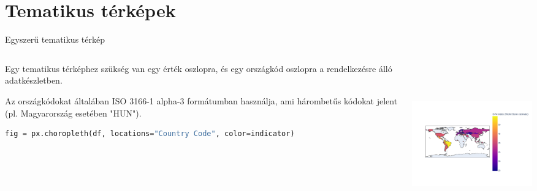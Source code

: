 \documentclass[english, aspectratio=169]{beamer}
\makeatletter
\let\origtableofcontents=\tableofcontents
\def\tableofcontents{\@ifnextchar[{\origtableofcontents}{\gobbletableofcontents}}
\def\gobbletableofcontents#1{\origtableofcontents}
\makeatother
\begin{document}
	\section{Tematikus térképek}
	
	\begin{frame}{}
		\tableofcontents[currentsection]
	\end{frame}
	
	\begin{frame}[fragile]{Egyszerű tematikus térkép}
		\begin{columns}
			\begin{column}{.5\textwidth}
				Egy tematikus térképhez szükség van egy érték oszlopra, és egy országkód oszlopra a rendelkezésre álló adatkészletben.\par\smallskip
				Az országkódokat általában ISO 3166-1 alpha-3 formátumban használja, ami hárombetűs kódokat jelent (pl. Magyarország esetében "HUN").\par\smallskip
				\begin{lstlisting}[language=python]
fig = px.choropleth(df, locations="Country Code", color=indicator)				
				\end{lstlisting}
			\end{column}
			\begin{column}{.5\textwidth}
				\begin{center}
					\includegraphics[width=7cm, height=7cm, keepaspectratio]{images/scatter_20.png}
				\end{center}
			\end{column}
		\end{columns}
	\end{frame}
	
\end{document}
